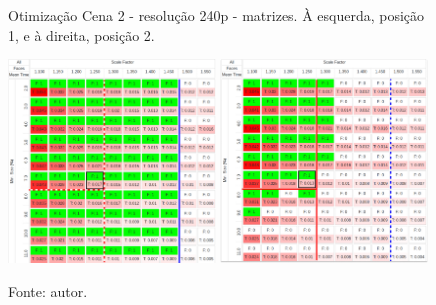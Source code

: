 \begin{figure}[H]
    \centering
    \caption[Otimização Cena 2 - resolução 240p - matrizes. À esquerda posição 1 e à direita, posição 2]{Otimização Cena 2 - resolução 240p - matrizes. À esquerda, posição 1, e à direita, posição 2.}
    \includegraphics[width=0.49\textwidth]{Cap4_Experimentos_Realizados/Figures/cena2_320x240_pos1_matriz.jpg}
    \includegraphics[width=0.49\textwidth]{Cap4_Experimentos_Realizados/Figures/cena2_320x240_pos2_matriz.jpg}
    \caption*{Fonte: autor.}
    \label{fig:otimizacaoCena2_240p_matrizes}
\end{figure}

